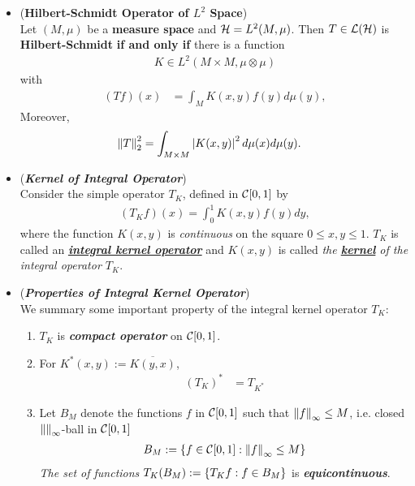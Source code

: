 \documentclass[11pt]{article}
\begin{document}
\begin{itemize}
\item \begin{theorem} (\textbf{Hilbert-Schmidt Operator of $L^2$ Space}) \citep{reed1980methods}\\
Let $(M, \mu)$ be a \textbf{measure space} and  ${\mathcal H} = L^2(M, \mu)$.  Then $T \in {\mathcal L}({\mathcal H})$ is \textbf{Hilbert-Schmidt} \textbf{if and only if} there is a function 
\begin{align*}
K \in L^2(M \times M, \mu \otimes \mu)
\end{align*}
with 
\begin{align*}
(T f)(x) &= \int_{M} K(x, y)f(y) d\mu(y),
\end{align*}
Moreover, 
\begin{align*}
\left\|T\right\|_{2}^2 &= \int_{M \times M} \left\lvert K(x, y) \right\rvert^2 d\mu(x) d\mu(y).
\end{align*}
\end{theorem}



\item \begin{definition} (\emph{\textbf{Kernel of Integral Operator}})\\
Consider the simple operator $T_{K}$, defined in ${\mathcal C}[0, 1]$ by 
\begin{align*}
(T_{K}f)(x) = \int_{0}^{1} K(x, y)f(y) dy,
\end{align*} where the function $K(x, y)$ is \emph{continuous} on the square $0\le x, y \le 1$.  $T_{K}$ is called an \underline{\emph{\textbf{integral kernel operator}}} and $K(x, y)$ is called \emph{the \underline{\textbf{kernel}} of the integral operator $T_K$}. 
\end{definition}

\item \begin{remark} (\emph{\textbf{Properties of Integral Kernel Operator}})\\
We summary some important property of the integral kernel operator $T_K$:
\begin{enumerate}
\item $T_K$ is \emph{\textbf{compact operator}} on ${\mathcal C}[0,1]$.

\item For $K^{*}(x, y) := \overline{K(y, x)}$, 
\begin{align*}
(T_{K})^{*} &= T_{K^{*}}
\end{align*}

\item Let $B_M$ denote the functions $f$ in ${\mathcal C}[0, 1]$ such that $\left\|f\right\|_{\infty} \le M$, i.e. closed $\left\|\right\|_{\infty}$-ball in ${\mathcal C}[0, 1]$
\begin{align*}
B_M := \left\{f \in {\mathcal C}[0, 1]: \left\|f\right\|_{\infty} \le M\right\}
\end{align*} \emph{The set of functions} $T_K(B_M) := \left\{T_{K}f: f\in B_M\right\}$ is \emph{\textbf{equicontinuous}}.



\end{enumerate}
\end{remark}
\end{itemize}
\end{document}
